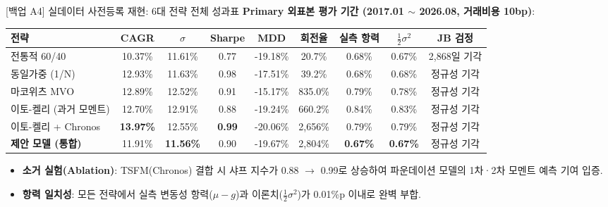 \begin{frame}{[백업 A4] 실데이터 사전등록 재현: 6대 전략 전체 성과표}
\scriptsize
\textbf{Primary 외표본 평가 기간 (2017.01 $\sim$ 2026.08, 거래비용 10bp)}:
\begin{table}[H]
\centering
\begin{tabular}{lcccccccc}
\toprule
\textbf{전략} & \textbf{CAGR} & \textbf{$\sigma$} & \textbf{Sharpe} & \textbf{MDD} & \textbf{회전율} & \textbf{실측 항력} & \textbf{$\frac{1}{2}\sigma^2$} & \textbf{JB 검정} \\
\midrule
전통적 60/40 & 10.37\% & 11.61\% & 0.77 & -19.18\% & 20.7\% & 0.68\% & 0.67\% & 2,868일 기각 \\
동일가중 (1/N) & 12.93\% & 11.63\% & 0.98 & -17.51\% & 39.2\% & 0.68\% & 0.68\% & 정규성 기각 \\
마코위츠 MVO & 12.89\% & 12.52\% & 0.91 & -15.17\% & 835.0\% & 0.79\% & 0.78\% & 정규성 기각 \\
이토-켈리 (과거 모멘트) & 12.70\% & 12.91\% & 0.88 & -19.24\% & 660.2\% & 0.84\% & 0.83\% & 정규성 기각 \\
이토-켈리 + Chronos & \textbf{13.97\%} & 12.55\% & \textbf{0.99} & -20.06\% & 2,656\% & 0.79\% & 0.79\% & 정규성 기각 \\
\textbf{제안 모델 (통합)} & 11.91\% & \textbf{11.56\%} & 0.90 & -19.67\% & 2,804\% & \textbf{0.67\%} & \textbf{0.67\%} & 정규성 기각 \\
\bottomrule
\end{tabular}
\end{table}

\begin{itemize}
  \tiny
  \item \textbf{소거 실험(Ablation)}: TSFM(Chronos) 결합 시 샤프 지수가 0.88 $\rightarrow$ 0.99로 상승하여 파운데이션 모델의 1차·2차 모멘트 예측 기여 입증.
  \item \textbf{항력 일치성}: 모든 전략에서 실측 변동성 항력($\mu - g$)과 이론치($\frac{1}{2}\sigma^2$)가 0.01\%p 이내로 완벽 부합.
\end{itemize}
\end{frame}


